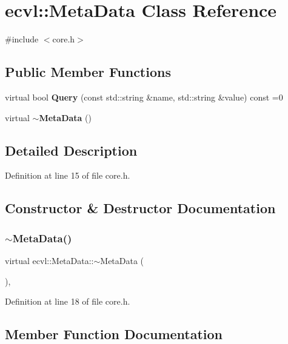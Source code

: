\section{ecvl\+::Meta\+Data Class Reference}
\label{classecvl_1_1_meta_data}


{\ttfamily \#include $<$core.\+h$>$}

\subsection*{Public Member Functions}
\begin{DoxyCompactItemize}
\item 
virtual bool \textbf{ Query} (const std\+::string \&name, std\+::string \&value) const =0
\item 
virtual \textbf{ $\sim$\+Meta\+Data} ()
\end{DoxyCompactItemize}


\subsection{Detailed Description}


Definition at line 15 of file core.\+h.



\subsection{Constructor \& Destructor Documentation}
\mbox{\label{classecvl_1_1_meta_data_a53dd49f5c867029c23dcfab7a88709fa}} 
\subsubsection{$\sim$MetaData()}
{\footnotesize\ttfamily virtual ecvl\+::\+Meta\+Data\+::$\sim$\+Meta\+Data (\begin{DoxyParamCaption}{ }\end{DoxyParamCaption})\hspace{0.3cm}{\ttfamily [inline]}, {\ttfamily [virtual]}}



Definition at line 18 of file core.\+h.



\subsection{Member Function Documentation}
\mbox{\label{classecvl_1_1_meta_data_a5f12fad6548dfa7da9920957e68a5d70}} 
